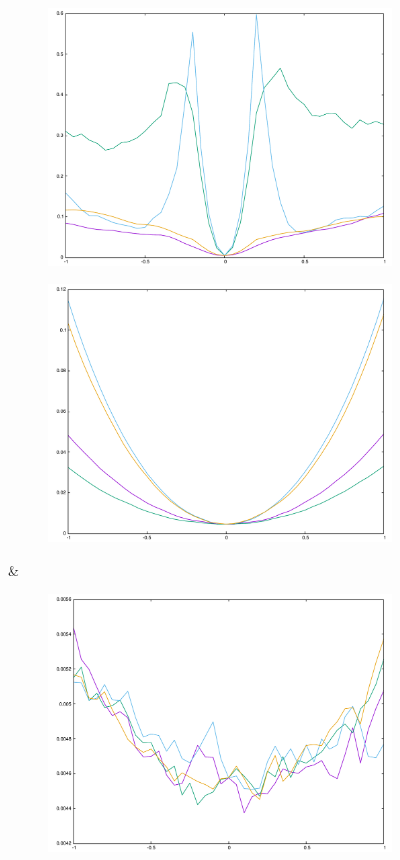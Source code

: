 \begin{figure}[H]
\begin{subfigure}{.33\textwidth}
	\includegraphics[width=\linewidth]{fig/ajherr/t3t/L_chi.pdf}
\end{subfigure}%
\begin{subfigure}{.33\textwidth}
	\includegraphics[width=\linewidth]{fig/ajherr/t3t/M_chi.pdf}
\end{subfigure}&
\begin{subfigure}{.33\textwidth}
	\includegraphics[width=\linewidth]{fig/ajherr/t3t/S_chi.pdf}

\end{subfigure}
\end{figure}
